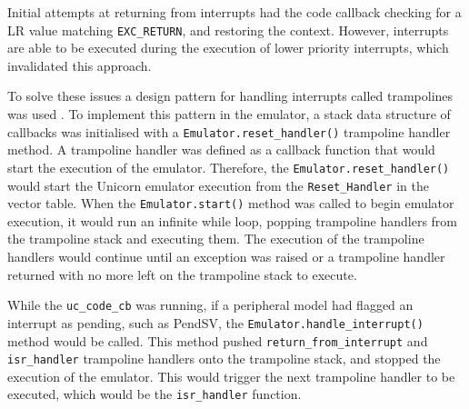 \documentclass[../report.tex]{subfiles}
\begin{document}
Initial attempts at returning from interrupts had the code callback checking
for a LR value matching \lstinline|EXC_RETURN|, and restoring the context.
However, interrupts are able to be executed during the execution of lower
priority interrupts, which invalidated this approach.

To solve these issues a design pattern for handling interrupts called
trampolines was used \citep{trampoline}. To implement this pattern in the
emulator, a stack data structure of callbacks was initialised with a
\lstinline|Emulator.reset_handler()| trampoline handler method. A trampoline
handler was defined as a callback function that would start the execution of
the emulator. Therefore, the \lstinline|Emulator.reset_handler()| would start
the Unicorn emulator execution from the \lstinline|Reset_Handler| in the vector
table. When the \lstinline|Emulator.start()| method was called to begin
emulator execution, it would run an infinite while loop, popping trampoline
handlers from the trampoline stack and executing them. The execution of the
trampoline handlers would continue until an exception was raised or a
trampoline handler returned with no more left on the trampoline stack to
execute.

While the \lstinline|uc_code_cb| was running, if a peripheral model had flagged an
interrupt as pending, such as PendSV, the
\lstinline|Emulator.handle_interrupt()| method would be called. This method
pushed \lstinline|return_from_interrupt| and \lstinline|isr_handler| trampoline
handlers onto the trampoline stack, and stopped the execution of the emulator.
This would trigger the next trampoline handler to be executed, which would be
the \lstinline|isr_handler| function.
\end{document}
